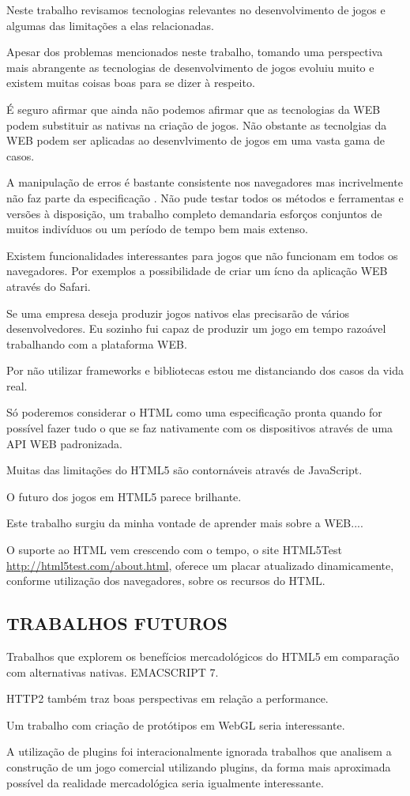 \begin{draft}

Neste trabalho revisamos tecnologias relevantes no desenvolvimento de
jogos e algumas das limitações a elas relacionadas.

Apesar dos problemas mencionados neste trabalho, tomando uma perspectiva
mais abrangente as tecnologias de desenvolvimento de jogos evoluiu muito
e existem muitas coisas boas para se dizer à respeito.

É seguro afirmar que ainda não podemos afirmar que as tecnologias da
WEB podem substituir as nativas na criação de jogos. Não obstante as
tecnolgias da WEB podem ser aplicadas ao desenvlvimento de jogos em uma
vasta gama de casos.

A manipulação de erros é bastante consistente nos navegadores mas 
incrivelmente não faz parte da especificação \autocite{howBrowsersWork}.
Não pude testar todos os métodos e ferramentas e versões à
disposição, um trabalho completo demandaria esforços conjuntos de
muitos indivíduos ou um período de tempo bem mais extenso. 

Existem funcionalidades interessantes para jogos que não funcionam em
todos os navegadores. Por exemplos a possibilidade de criar um ícno da
aplicação WEB através do Safari.

Se uma empresa deseja produzir jogos nativos elas precisarão de vários
desenvolvedores. Eu sozinho fui capaz de produzir um jogo em tempo
razoável trabalhando com a plataforma WEB.

Por não utilizar frameworks e bibliotecas estou me distanciando
dos casos da vida real.

Só poderemos considerar o HTML como uma especificação pronta quando
for possível fazer tudo o que se faz nativamente com os dispositivos
através de uma API WEB padronizada.

Muitas das limitações do HTML5 são contornáveis através de JavaScript.

O futuro dos jogos em HTML5 parece brilhante.


Este trabalho surgiu da minha vontade de aprender mais sobre a WEB....

O suporte ao HTML vem crescendo com o tempo, o site HTML5Test
\url{http://html5test.com/about.html}, oferece um placar atualizado
dinamicamente, conforme utilização dos navegadores, sobre os recursos
do HTML.

\subsection{TRABALHOS FUTUROS}

Trabalhos que explorem os benefícios mercadológicos do HTML5 em comparação com alternativas nativas.
EMACSCRIPT 7.

HTTP2 também traz boas perspectivas em relação a performance.

Um trabalho com criação de protótipos em WebGL seria interessante.

A utilização de plugins foi interacionalmente ignorada trabalhos
que analisem a construção de um jogo comercial utilizando plugins,
da forma mais aproximada possível da realidade mercadológica seria
igualmente interessante.


\end{draft}

